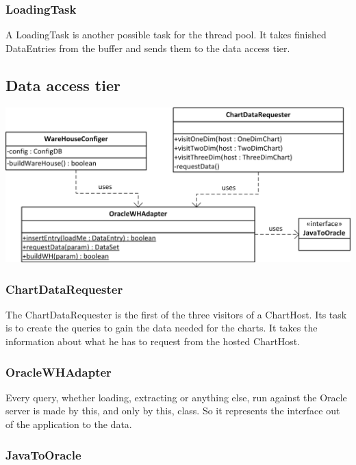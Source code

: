 \subsubsection*{LoadingTask}
A LoadingTask is another possible task for the thread pool.
It takes finished DataEntries from the buffer and sends them to the data access tier.




\newpage 
\subsection{Data access tier}

\begin{center}
\includegraphics{Pictures/Parts/Data.png}
\end{center} 

\subsubsection*{ChartDataRequester}

The ChartDataRequester is the first of the three visitors of a ChartHost. Its task is to 
create the queries to gain the data needed for the charts. It takes the information about what he
has to request from the hosted ChartHost.


\subsubsection*{OracleWHAdapter}

Every query, whether loading, extracting or anything else, run against the Oracle server is made by this,
and only by this, class. So it represents the interface out of the application to the data.



\subsubsection*{JavaToOracle}

